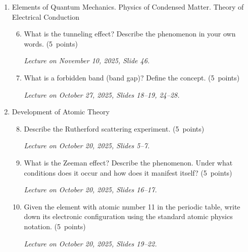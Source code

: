 \documentclass[a4paper,12pt]{letter}
\begin{document}
\begin{enumerate}[label=\Roman*.]
\begin{enumerate}[label=\arabic*.]
\item Formulate the de Broglie principle in your own words. \hfill (5~points)

\smallskip
\textit{Lecture on October 20, 2025, Slide 23.}


\end{enumerate}
  

\item Elements of Quantum Mechanics. Physics of Condensed Matter. Theory of Electrical Conduction

\begin{enumerate}[label=\arabic*.]
\setcounter{enumii}{5} %

\item What is the tunneling effect? Describe the phenomenon in your own words. \hfill (5~points)

\smallskip
\textit{Lecture on November 10, 2025, Slide 46.}

\item What is a forbidden band (band gap)? Define the concept. \hfill (5~points)

\smallskip
\textit{Lecture on October 27, 2025, Slides 18--19, 24--28.}  

\end{enumerate}

  
\item Development of Atomic Theory

\begin{enumerate}[label=\arabic*.]
\setcounter{enumii}{7} %

\item Describe the Rutherford scattering experiment. \hfill (5~points)

\smallskip
\textit{Lecture on October 20, 2025, Slides 5--7.}

\item What is the Zeeman effect? Describe the phenomenon. Under what conditions does it occur and how does it manifest itself? \hfill (5~points)

\smallskip
\textit{Lecture on October 20, 2025, Slides 16--17.}
  
\item Given the element with atomic number 11 in the periodic table, write down its electronic configuration using the standard atomic physics notation. \hfill (5~points)

\smallskip
\textit{Lecture on October 20, 2025, Slides 19--22.}
  
\end{enumerate}

\end{enumerate}
\end{document}
